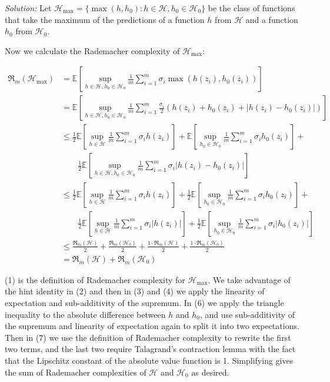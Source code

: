 \documentclass[
10pt, %
a4paper, %
oneside, %
headinclude,footinclude, %
BCOR5mm, %
]{scrartcl}
\newenvironment{solution}
               {\textit{Solution:}}
               {}
\begin{document}
\begin{solution}
Let $\mathcal{H}_{\max} = \{\max(h, h_0 ): h \in \mathcal{H}, h_0 \in \mathcal{H_0} \}$ be the class of functions that take the maximum of the predictions of a function $h$ from $\mathcal{H}$ and a function $h_0$ from $\mathcal{H}_0$.

Now we calculate the Rademacher complexity of $\mathcal{H}_{\max}$:

\begin{align}
\mathfrak{R}_m(\mathcal{H}_{\max}) &= \mathbb{E} \left[ \sup_{h\in\mathcal{H}, h_0\in\mathcal{H}_0} \frac{1}{m} \sum_{i=1}^m \sigma_i \max(h(z_i), h_0(z_i)) \right] \\
&= \mathbb{E} \left[ \sup_{h\in\mathcal{H}, h_0\in\mathcal{H}_0} \frac{1}{m} \sum_{i=1}^m \frac{\sigma_i}{2} (h(z_i) + h_0(z_i) + |h(z_i) - h_0(z_i)|) \right] \\
&\leq \frac{1}{2} \mathbb{E}\left[ \sup_{h\in\mathcal{H}}\frac{1}{m} \sum_{i=1}^m \sigma_i h(z_i)\right] + \mathbb{E}\left[\sup_{h_0\in\mathcal{H}_0}\frac{1}{m} \sum_{i=1}^m \sigma_i h_0(z_i)\right] + \\
&\qquad \frac{1}{2} \mathbb{E}\left[\sup_{h\in\mathcal{H}, h_0\in\mathcal{H}_0} \frac{1}{m} \sum_{i=1}^m \sigma_i |h(z_i) - h_0(z_i)|\right] \\
&\leq \frac{1}{2} \mathbb{E}\left[ \sup_{h\in\mathcal{H}}\frac{1}{m} \sum_{i=1}^m \sigma_i h(z_i)\right] + \frac{1}{2}\mathbb{E}\left[\sup_{h_0\in\mathcal{H}_0}\frac{1}{m} \sum_{i=1}^m \sigma_i h_0(z_i)\right] + \\
&\qquad \frac{1}{2} \mathbb{E}\left[\sup_{h\in\mathcal{H}} \frac{1}{m} \sum_{i=1}^m \sigma_i |h(z_i)|\right] + \frac{1}{2} \mathbb{E}\left[\sup_{h_0\in\mathcal{H}_0} \frac{1}{m} \sum_{i=1}^m \sigma_i |h_0(z_i)|\right] \\
&\leq \frac{\mathfrak{R}_m(\mathcal{H})}{2} + \frac{\mathfrak{R}_m(\mathcal{H}_0)}{2} + \frac{1 \cdot \mathfrak{R}_m(\mathcal{H})}{2} + \frac{1 \cdot \mathfrak{R}_m(\mathcal{H}_0)}{2} \\
&= \mathfrak{R}_m(\mathcal{H}) + \mathfrak{R}_m(\mathcal{H}_0)
\end{align}

(1) is the definition of Rademacher complexity for $\mathcal{H}_{\max}$. We take advantage of the hint identity in (2) and then in (3) and (4) we apply the linearity of expectation and sub-additivity of the supremum. In (6) we apply the triangle inequality to the absolute difference between $h$ and $h_0$, and use sub-additivity of the supremum and linearity of expectation again to split it into two expectations. Then in (7) we use the definition of Rademacher complexity to rewrite the first two terms, and the last two require Talagrand's contraction lemma with the fact that the Lipschitz constant of the absolute value function is 1. Simplifying gives the sum of Rademacher complexities of $\mathcal{H}$ and $\mathcal{H}_0$ as desired.

\end{solution}
\end{document}
